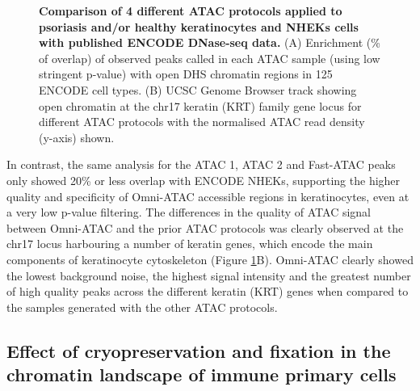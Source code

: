 \begin{figure}[htbp]
\begin{subfigure}{0.5\textwidth}
\caption{\textbf{}}
\end{subfigure}
\caption[Comparison of 4 different ATAC protocols applied to psoriasis and/or healthy keratinocytes and NHEKs cells with published ENCODE DNase-seq data.]{\textbf{Comparison of 4 different ATAC protocols applied to psoriasis and/or healthy keratinocytes and NHEKs cells with published ENCODE DNase-seq data.} (A) Enrichment (\% of overlap) of observed peaks called in each ATAC sample (using low stringent p-value) with open DHS chromatin regions in 125 ENCODE cell types. (B) UCSC Genome Browser track showing open chromatin at the chr17 keratin (KRT) family gene locus for different ATAC protocols with the normalised ATAC read density (y-axis) shown.}
\label{figure:ATAC_skin_ENCODE_overlap_and_tracks}
\end{figure} 

In contrast, the same analysis for the ATAC 1, ATAC 2 and Fast-ATAC peaks only showed 20\% or less overlap with ENCODE NHEKs, supporting the higher quality and specificity of Omni-ATAC accessible regions in keratinocytes, even at a very low p-value filtering. The differences in the quality of ATAC signal between Omni-ATAC and the prior ATAC protocols was clearly observed at the chr17 locus harbouring a number of keratin genes, which encode the main components of keratinocyte cytoskeleton (Figure \ref{figure:ATAC_skin_ENCODE_overlap_and_tracks}B). Omni-ATAC clearly showed the lowest background noise, the highest signal intensity and the greatest number of high quality peaks across the different keratin (KRT) genes when compared to the samples generated with the other ATAC protocols. %


\subsection{Effect of cryopreservation and fixation in the chromatin landscape of immune primary cells}
\label{Core}
